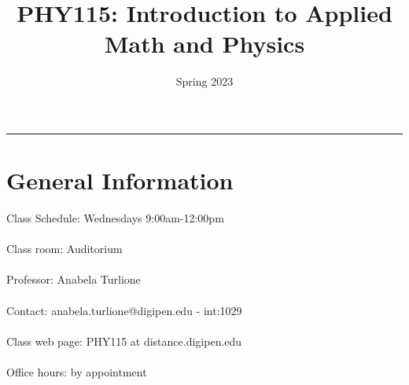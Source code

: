\documentclass[12pt]{article}
\title{PHY115: Introduction to Applied Math and Physics}
\author{Spring 2023}
\date{}
\newcommand{\blankline}{\quad\pagebreak[2]}
\begin{document}
\maketitle









\hrule



\section*{General Information }

Class Schedule: Wednesdays 9:00am-12:00pm \\ 
\\
Class room: Auditorium\\
\\
Professor: Anabela Turlione\\
\\
Contact: anabela.turlione@digipen.edu - int:1029\\
\\
Class web page: PHY115 at distance.digipen.edu\\
\\
Office hours: by appointment\\



\end{document}
